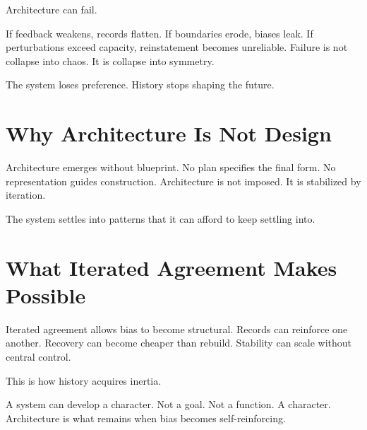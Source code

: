 \documentclass[11pt,twoside,openright]{book}
\begin{document}
Architecture can fail.

If feedback weakens, records flatten. If boundaries erode, biases leak. If perturbations exceed capacity, reinstatement becomes unreliable. Failure is not collapse into chaos. It is collapse into symmetry.

The system loses preference. History stops shaping the future.

\section*{Why Architecture Is Not Design}

Architecture emerges without blueprint. No plan specifies the final form. No representation guides construction. Architecture is not imposed. It is stabilized by iteration.

The system settles into patterns that it can afford to keep settling into.

\section*{What Iterated Agreement Makes Possible}

Iterated agreement allows bias to become structural. Records can reinforce one another. Recovery can become cheaper than rebuild. Stability can scale without central control.

This is how history acquires inertia.

A system can develop a character. Not a goal. Not a function. A character. Architecture is what remains when bias becomes self-reinforcing.
\end{document}
